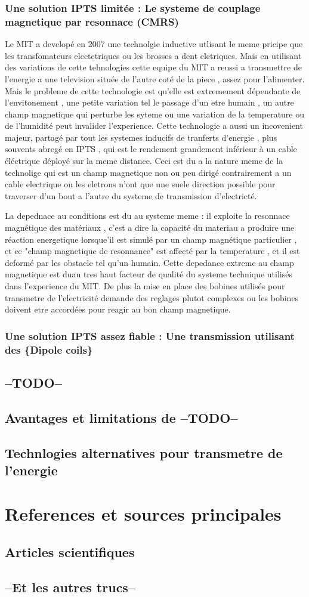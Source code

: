 \documentclass[11pt]{report}
\begin{document}
\subsection{Une solution IPTS limitée : Le systeme de couplage magnetique par resonnace (CMRS)}
	Le MIT a developé en 2007 une technolgie inductive utlisant le meme pricipe que les transfomateurs electetriques ou les brosses a dent eletriques. Mais en utilisant des variations de cette tehnologies cette equipe du MIT a reussi a transmettre de l'energie a une television située de l'autre coté de la piece , assez pour l'alimenter. Mais le probleme de cette technologie est qu'elle est extremement dépendante de l'envitonement , une petite variation tel le passage d'un etre humain , un autre champ magnetique qui perturbe les syteme ou une variation de la temperature ou de l'humidité peut invalider l'experience. Cette technologie a aussi un incovenient majeur, partagé par tout les systemes inducifs de tranferts d'energie , plus souvents abregé en IPTS , qui est le rendement grandement inférieur à un cable éléctrique déployé sur la meme distance. Ceci est du a la nature meme de la technolige qui est un champ magnetique non ou peu dirigé contrairement a un cable electrique ou les eletrons n'ont que une suele direction possible pour traverser d'un bout a l'autre du systeme de transmission d'electricté.

	La depednace au conditions est du au systeme meme : il exploite la resonnace magnétique des matériaux , c'est a dire la capacité du materiau a produire une réaction energetique lorsque'il est simulé par un champ magnétique particulier , et ce "champ magnetique de resonnance" est affecté par la temperature , et il est deformé par les obstacle tel qu'un humain. Cette depedance extreme au champ magnetique est duau tres haut facteur de qualité du systeme technique utilisés dans l'experience du MIT. De plus la mise en place des bobines utilisés pour transmetre de l'electricité demande des reglages plutot complexes ou les bobines doivent etre accordées pour reagir au bon champ magnetique.
\subsection{Une solution IPTS assez fiable : Une transmission utilisant des \{Dipole coils\}}
\section{--TODO--} %
\section{Avantages et limitations de --TODO--}
\section{Technlogies alternatives pour transmetre de l'energie}

\chapter{References et sources principales}
\section{Articles scientifiques}
\section{--Et les autres trucs--}
\end{document}
